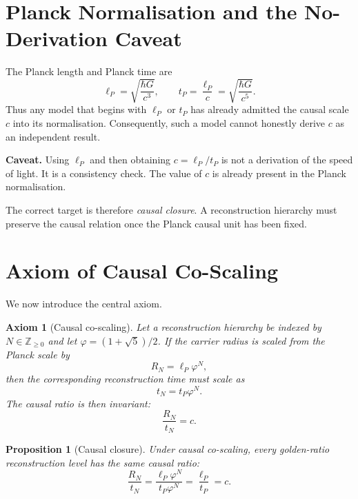 \documentclass[11pt,a4paper]{article}
\newtheorem{axiom}{Axiom}
\newtheorem{proposition}{Proposition}
\newcommand{\lP}{\ell_{P}}
\newcommand{\tP}{t_{P}}
\newcommand{\ph}{\varphi}
\begin{document}
\section{Planck Normalisation and the No-Derivation Caveat}

The Planck length and Planck time are
\[
  \lP=\sqrt{\frac{\hbar G}{c^3}},
  \qquad
  \tP=\frac{\lP}{c}
  =\sqrt{\frac{\hbar G}{c^5}}.
\]
Thus any model that begins with $\lP$ or $\tP$ has already admitted the causal scale
$c$ into its normalisation.  Consequently, such a model cannot honestly derive $c$
as an independent result.

\begin{cautionBox}
\textbf{Caveat.}
Using $\lP$ and then obtaining $c=\lP/\tP$ is not a derivation of the speed of light.
It is a consistency check.  The value of $c$ is already present in the Planck
normalisation.
\end{cautionBox}

The correct target is therefore \emph{causal closure}.  A reconstruction hierarchy
must preserve the causal relation once the Planck causal unit has been fixed.

\section{Axiom of Causal Co-Scaling}

We now introduce the central axiom.

\begin{axiom}[Causal co-scaling]
Let a reconstruction hierarchy be indexed by $N\in\mathbb{Z}_{\ge 0}$ and let
$\ph=(1+\sqrt5)/2$.  If the carrier radius is scaled from the Planck scale by
\[
  R_N=\lP\ph^N,
\]
then the corresponding reconstruction time must scale as
\[
  t_N=\tP\ph^N.
\]
The causal ratio is then invariant:
\[
  \frac{R_N}{t_N}=c.
\]
\end{axiom}

\begin{proposition}[Causal closure]
Under causal co-scaling, every golden-ratio reconstruction level has the same
causal ratio:
\[
  \frac{R_N}{t_N}
  =
  \frac{\lP\ph^N}{\tP\ph^N}
  =
  \frac{\lP}{\tP}
  =
  c.
\]
\end{proposition}
\end{document}
